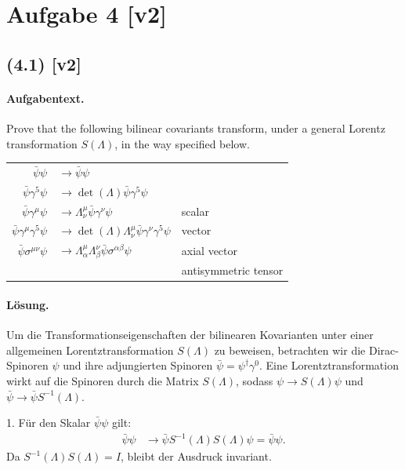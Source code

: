 \documentclass[11pt,a4paper]{article}
\begin{document}

\section*{Aufgabe 4 [v2]}
\subsection*{(4.1) [v2]}
\paragraph{Aufgabentext.}
Prove that the following bilinear covariants transform, under a general Lorentz transformation $S(\Lambda)$, in the way specified below.

\begin{tabular}{rll}
$\bar{\psi} \psi$ & $\rightarrow \bar{\psi} \psi$ & \\
$\bar{\psi} \gamma^5 \psi$ & $\rightarrow \operatorname{det}(\Lambda) \bar{\psi} \gamma^5 \psi$ & \\
$\bar{\psi} \gamma^\mu \psi$ & $\rightarrow \Lambda_\nu^\mu \bar{\psi} \gamma^\nu \psi$ & scalar \\
$\bar{\psi} \gamma^\mu \gamma^5 \psi$ & $\rightarrow \operatorname{det}(\Lambda) \Lambda_\nu^\mu \bar{\psi} \gamma^\nu \gamma^5 \psi$ & vector \\
$\bar{\psi} \sigma^{\mu \nu} \psi$ & $\rightarrow \Lambda_\alpha^\mu \Lambda_\beta^\nu \bar{\psi} \sigma^{\alpha \beta} \psi$ & axial vector \\
& & antisymmetric tensor
\end{tabular}

\paragraph{Lösung.}
Um die Transformationseigenschaften der bilinearen Kovarianten unter einer allgemeinen Lorentztransformation \( S(\Lambda) \) zu beweisen, betrachten wir die Dirac-Spinoren \(\psi\) und ihre adjungierten Spinoren \(\bar{\psi} = \psi^\dagger \gamma^0\). Eine Lorentztransformation wirkt auf die Spinoren durch die Matrix \( S(\Lambda) \), sodass \(\psi \rightarrow S(\Lambda) \psi\) und \(\bar{\psi} \rightarrow \bar{\psi} S^{-1}(\Lambda)\).

1. Für den Skalar \(\bar{\psi} \psi\) gilt:
\begin{align*}
\bar{\psi} \psi &\rightarrow \bar{\psi} S^{-1}(\Lambda) S(\Lambda) \psi = \bar{\psi} \psi.
\end{align*}
Da \(S^{-1}(\Lambda) S(\Lambda) = I\), bleibt der Ausdruck invariant.
\end{document}
